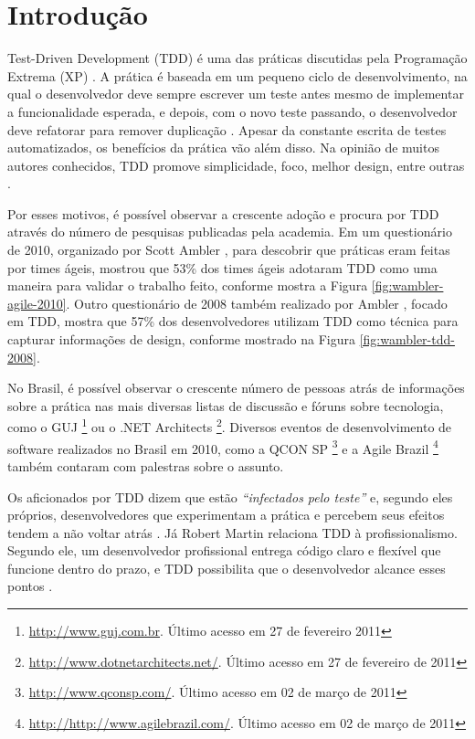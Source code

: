 \chapter{Introdução}
\label{cap:introducao}

Test-Driven Development (TDD) é uma das práticas discutidas pela Programação
Extrema (XP) \cite{XPExplained}. A prática é baseada em um pequeno ciclo de
desenvolvimento, na qual o desenvolvedor deve sempre escrever um teste antes
mesmo de implementar a funcionalidade esperada, e depois, com o novo teste
passando, o desenvolvedor deve refatorar para remover duplicação
\cite{TDDByExample}.
Apesar da constante escrita de testes automatizados, os benefícios da prática 
vão além disso. Na opinião de muitos autores conhecidos, TDD promove
simplicidade, foco, melhor design, entre outras \cite{TDDByExample}
\cite{GOOS} \cite{astels-tdd}.

Por esses motivos, é possível observar a crescente adoção e procura por TDD
através do número de pesquisas publicadas pela academia.
Em um questionário de 2010, organizado por Scott Ambler
\cite{wambler-survey-agile}, para descobrir que práticas eram feitas por times
ágeis, mostrou que 53\% dos times ágeis adotaram TDD como uma maneira para
validar o trabalho feito, conforme mostra a Figura \ref{fig:wambler-agile-2010}. 
Outro questionário de 2008 também realizado por Ambler
\cite{wambler-survey-tdd}, focado em TDD, mostra que 57\% dos desenvolvedores 
utilizam TDD como técnica para capturar informações de design, conforme mostrado
na Figura \ref{fig:wambler-tdd-2008}.

No Brasil, é possível observar o crescente número de pessoas atrás de
informações sobre a prática nas mais diversas listas de discussão e fóruns sobre
tecnologia, como o GUJ \footnote{\url{http://www.guj.com.br}.
Último acesso em 27 de fevereiro 2011} ou o .NET Architects 
\footnote{\url{http://www.dotnetarchitects.net/}. Último acesso em
27 de fevereiro de 2011}. Diversos eventos de desenvolvimento de
software realizados no Brasil em 2010, como a QCON SP
\footnote{\url{http://www.qconsp.com/}. Último acesso em 02 de março de 2011} e
a Agile Brazil \footnote{\url{http://http://www.agilebrazil.com/}. Último acesso
em 02 de março de 2011} também contaram com palestras sobre o assunto.

Os aficionados por TDD dizem que estão \textit{``infectados pelo teste''}  e,
segundo eles próprios, desenvolvedores que experimentam a prática e percebem
seus efeitos tendem a não voltar atrás \cite{tdd-fearless}.
Já Robert Martin relaciona TDD à profissionalismo. Segundo ele, um desenvolvedor
profissional entrega código claro e flexível que funcione dentro do prazo, e TDD
possibilita que o desenvolvedor alcance esses pontos \cite{martin-profissionalismo}.

